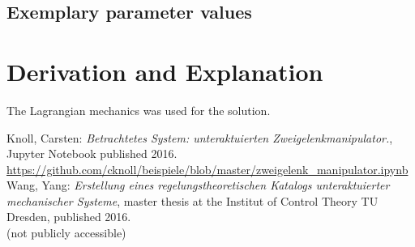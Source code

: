 \documentclass[10pt,a4paper]{article}
\begin{document}
	
	\subsection{Exemplary parameter values}
	

	
	\section{Derivation and Explanation} %
	
	The Lagrangian mechanics was used for the solution.
	
	
	\begin{thebibliography}{10}	
		Knoll, Carsten: 
		\textit{Betrachtetes System: unteraktuierten Zweigelenkmanipulator.}, Jupyter Notebook published 2016. \\
		\url{https://github.com/cknoll/beispiele/blob/master/zweigelenk_manipulator.ipynb}	
		Wang, Yang: 
		\textit{Erstellung eines regelungstheoretischen Katalogs unteraktuierter mechanischer Systeme}, master thesis at the Institut of Control Theory TU Dresden, published 2016. \\
		(not publicly accessible)
	\end{thebibliography}
\end{document}
